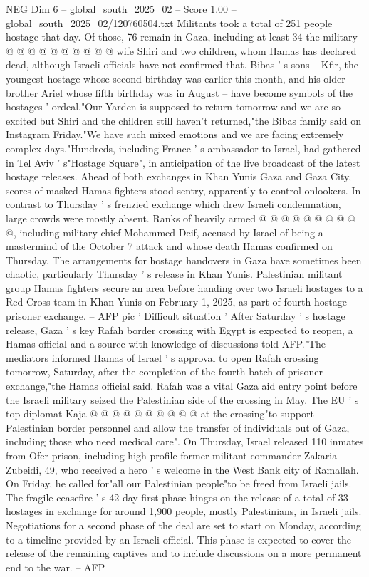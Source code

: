 \begin{textsample}{NEG Dim 6 – global\_south\_2025\_02 – Score 1.00 – global\_south\_2025\_02/120760504.txt}
Militants took a total of 251 people hostage that day.
Of those, 76 remain in Gaza, including at least 34 the military @ @ @ @ @ @ @ @ @ @ wife Shiri and two children, whom Hamas has declared dead, although Israeli officials have not confirmed that.
Bibas ' s sons -- Kfir, the youngest hostage whose second birthday was earlier this month, and his older brother Ariel whose fifth birthday was in August -- have become symbols of the hostages ' ordeal."Our Yarden is supposed to return tomorrow and we are so excited but Shiri and the children still haven't returned,"the Bibas family said on Instagram Friday."We have such mixed emotions and we are facing extremely complex days."Hundreds, including France ' s ambassador to Israel, had gathered in Tel Aviv ' s"Hostage Square", in anticipation of the live broadcast of the latest hostage releases.
Ahead of both exchanges in Khan Yunis Gaza and Gaza City, scores of masked Hamas fighters stood sentry, apparently to control onlookers.
In contrast to Thursday ' s frenzied exchange which drew Israeli condemnation, large crowds were mostly absent.
Ranks of heavily armed @ @ @ @ @ @ @ @ @ @, including military chief Mohammed Deif, accused by Israel of being a mastermind of the October 7 attack and whose death Hamas confirmed on Thursday.
The arrangements for hostage handovers in Gaza have sometimes been chaotic, particularly Thursday ' s release in Khan Yunis.
Palestinian militant group Hamas fighters secure an area before handing over two Israeli hostages to a Red Cross team in Khan Yunis on February 1, 2025, as part of fourth hostage-prisoner exchange. -- AFP pic ' Difficult situation ' After Saturday ' s hostage release, Gaza ' s key Rafah border crossing with Egypt is expected to reopen, a Hamas official and a source with knowledge of discussions told AFP."The mediators informed Hamas of Israel ' s approval to open Rafah crossing tomorrow, Saturday, after the completion of the fourth batch of prisoner exchange,"the Hamas official said.
Rafah was a vital Gaza aid entry point before the Israeli military seized the Palestinian side of the crossing in May.
The EU ' s top diplomat Kaja @ @ @ @ @ @ @ @ @ @ at the crossing"to support Palestinian border personnel and allow the transfer of individuals out of Gaza, including those who need medical care".
On Thursday, Israel released 110 inmates from Ofer prison, including high-profile former militant commander Zakaria Zubeidi, 49, who received a hero ' s welcome in the West Bank city of Ramallah.
On Friday, he called for"all our Palestinian people"to be freed from Israeli jails.
The fragile ceasefire ' s 42-day first phase hinges on the release of a total of 33 hostages in exchange for around 1,900 people, mostly Palestinians, in Israeli jails.
Negotiations for a second phase of the deal are set to start on Monday, according to a timeline provided by an Israeli official.
This phase is expected to cover the release of the remaining captives and to include discussions on a more permanent end to the war. -- AFP

\end{textsample}

